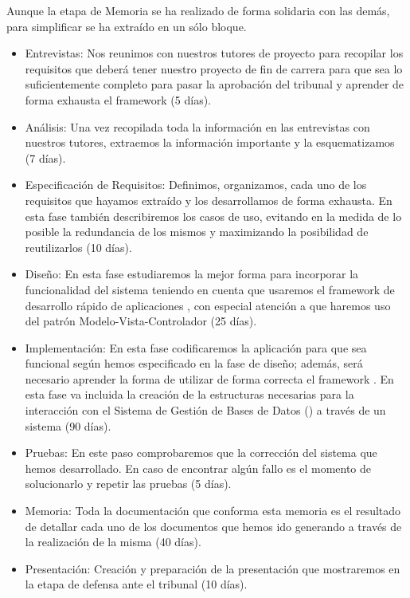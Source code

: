 Aunque la etapa de Memoria se ha realizado de forma solidaria con las demás,
para simplificar se ha extraído en un sólo bloque.

\begin{itemize}
\item Entrevistas: Nos reunimos con nuestros tutores de proyecto para recopilar
  los requisitos que deberá tener nuestro proyecto de fin de carrera para que
  sea lo suficientemente completo para pasar la aprobación del tribunal y
  aprender de forma exhausta el framework  (5 días).
\item Análisis: Una vez recopilada toda la información en las entrevistas con
  nuestros tutores, extraemos la información importante y la esquematizamos (7
  días).
\item Especificación de Requisitos: Definimos, organizamos, cada uno de los
  requisitos que hayamos extraído y los desarrollamos de forma exhausta. En esta
  fase también describiremos los casos de uso, evitando en la medida de lo
  posible la redundancia de los mismos y maximizando la posibilidad de
  reutilizarlos (10 días).
\item Diseño: En esta fase estudiaremos la mejor forma para incorporar la
  funcionalidad del sistema teniendo en cuenta que usaremos el framework de
  desarrollo rápido de aplicaciones , con especial
  atención a que haremos uso del patrón Modelo-Vista-Controlador (25 días).
\item Implementación: En esta fase codificaremos la aplicación para que sea
  funcional según hemos especificado en la fase de diseño; además, será
  necesario aprender la forma de utilizar de forma correcta el framework
  . En esta fase va incluida la creación de la
  estructuras necesarias para la interacción con el Sistema de Gestión de Bases
  de Datos () a través de un sistema  (90 días).
\item Pruebas: En este paso comprobaremos que la corrección del sistema que
  hemos desarrollado. En caso de encontrar algún fallo es el momento de
  solucionarlo y repetir las pruebas (5 días).
\item Memoria: Toda la documentación que conforma esta memoria es el resultado
  de detallar cada uno de los documentos que hemos ido generando a través de la
  realización de la misma (40 días).
\item Presentación: Creación y preparación de la presentación que mostraremos en
  la etapa de defensa ante el tribunal (10 días).
\end{itemize}
\newpage


